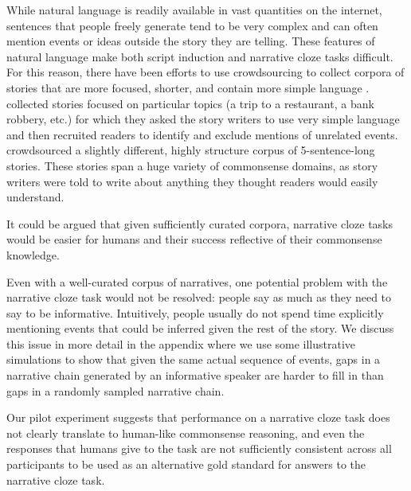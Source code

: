 \documentclass[10pt,a4paper]{article}
\newcommand{\todo}[1]{{\color{red}#1}}
\begin{document}
While natural language is readily available in vast quantities on the internet, sentences that people freely generate tend to be very complex and can often mention events or ideas outside the story they are telling. These features of natural language make both script induction and narrative cloze tasks difficult. For this reason, there have been efforts to use crowdsourcing to collect corpora of stories that are more focused, shorter, and contain more simple language \cite{li2013story, mostafazadeh2016corpus}.  collected stories focused on particular topics (a trip to a restaurant, a bank robbery, etc.) for which they asked the story writers to use very simple language and then recruited readers to identify and exclude mentions of unrelated events.  crowdsourced a slightly different, highly structure corpus of 5-sentence-long stories. These stories span a huge variety of commonsense domains, as story writers were told to write about anything they thought readers would easily understand.

It could be argued that given sufficiently curated corpora, narrative cloze tasks would be easier for humans and their success reflective of their commonsense knowledge.

Even with a well-curated corpus of narratives, one potential problem with the narrative cloze task would not be resolved: people say as much as they need to say to be informative. Intuitively, people usually do not spend time explicitly mentioning events that could be inferred given the rest of the story. We discuss this issue in more detail in the appendix where we use some illustrative simulations to show that given the same actual sequence of events, gaps in a narrative chain generated by an informative speaker are harder to fill in than gaps in a randomly sampled narrative chain.

Our pilot experiment suggests that performance on a narrative cloze task does not clearly translate to human-like commonsense reasoning, and even the responses that humans give to the task are not sufficiently consistent across all participants to be used as an alternative gold standard for answers to the narrative cloze task.

\end{document}
